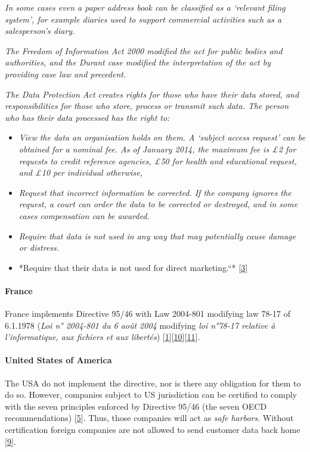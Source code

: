 \emph{In some cases even a paper address book can be classified as a
`relevant filing system', for example diaries used to support commercial
activities such as a salesperson's diary.}

\emph{The Freedom of Information Act 2000 modified the act for public
bodies and authorities, and the Durant case modified the interpretation
of the act by providing case law and precedent.}

\emph{The Data Protection Act creates rights for those who have their
data stored, and responsibilities for those who store, process or
transmit such data. The person who has their data processed has the
right to:}

\begin{itemize}
\itemsep1pt\parskip0pt
\item
  \emph{View the data an organisation holds on them. A `subject access
  request' can be obtained for a nominal fee. As of January 2014, the
  maximum fee is £2 for requests to credit reference agencies, £50 for
  health and educational request, and £10 per individual otherwise,}
\item
  \emph{Request that incorrect information be corrected. If the company
  ignores the request, a court can order the data to be corrected or
  destroyed, and in some cases compensation can be awarded.}
\item
  \emph{Require that data is not used in any way that may potentially
  cause damage or distress.}
\item
  *Require that their data is not used for direct marketing.``*
  {[}\hyperref[references]{3}{]}
\end{itemize}

\paragraph{France}

France implements Directive 95/46 with Law 2004-801 modifying law 78-17
of 6.1.1978 (\emph{Loi n° 2004-801 du 6 août 2004} modifying \emph{loi
n°78-17 relative à l'informatique, aux fichiers et aux libertés})
{[}\hyperref[references]{1}{]}{[}\hyperref[references]{10}{]}{[}\hyperref[references]{11}{]}.

\paragraph{United States of America}

The USA do not implement the directive, nor is there any obligation for
them to do so. However, companies subject to US jurisdiction can be
certified to comply with the seven principles enforced by Directive
95/46 (the seven OECD recommendations) {[}\hyperref[references]{5}{]}.
Thus, those companies will act as \emph{safe harbors}. Without
certification foreign companies are not allowed to send customer data
back home {[}\hyperref[references]{9}{]}.

